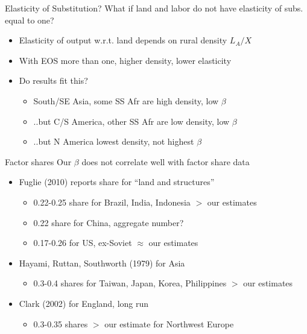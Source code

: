 \documentclass[10pt, xcolor=dvipsnames]{beamer}
\begin{document}
\begin{frame}{Elasticity of Substitution?}\label{eos}
What if land and labor do not have elasticity of subs. equal to one?
\begin{itemize}
  \item Elasticity of output w.r.t. land depends on rural density $L_A/X$
  \item With EOS more than one, higher density, lower elasticity
  \item Do results fit this?
  \begin{itemize}
    \item South/SE Asia, some SS Afr are high density, low $\beta$
    \item ..but C/S America, other SS Afr are low density, low $\beta$
    \item ..but N America lowest density, not highest $\beta$
  \end{itemize}
\end{itemize}
\hfill \hyperlink{rurdbeta}{}
\hfill \hyperlink{robustness}{}
\end{frame}

\begin{frame}{Factor shares}\label{shares}
Our $\beta$ does not correlate well with factor share data
\begin{itemize}
  \item Fuglie (2010) reports share for ``land and structures''
  \begin{itemize}
    \item 0.22-0.25 share for Brazil, India, Indonesia $>$ our estimates
    \item 0.22 share for China, aggregate number?
    \item 0.17-0.26 for US, ex-Soviet $\approx$ our estimates
  \end{itemize}
  \item Hayami, Ruttan, Southworth (1979) for Asia
    \begin{itemize}
      \item 0.3-0.4 shares for Taiwan, Japan, Korea, Philippines $>$ our estimates
    \end{itemize}
  \item Clark (2002) for England, long run
    \begin{itemize}
      \item 0.3-0.35 shares $>$ our estimate for Northwest Europe
    \end{itemize}
\end{itemize}
\end{frame}
\end{document}
